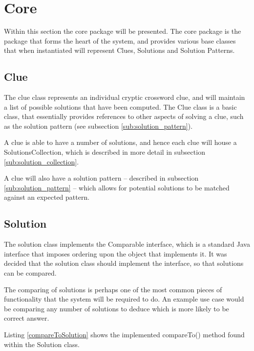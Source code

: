 \section{Core}
\label{sec:core}

Within this section the core package will be presented. The core package is the 
package that forms the heart of the system, and provides various base classes
that when instantiated will represent Clues, Solutions and Solution Patterns.


\subsection{Clue}
\label{sub:clue}

The clue class represents an individual cryptic crossword clue, and will 
maintain a list of possible solutions that have been computed. The Clue class is
a basic class, that essentially provides references to other aspects of solving 
a clue, such as the solution pattern (see subsection \ref{sub:solution_pattern}).

A clue is able to have a number of solutions, and hence each clue will house a 
SolutionsCollection, which is described in more detail in subsection 
\ref{sub:solution_collection}.

A clue will also have a solution pattern -- described in subsection 
\ref{sub:solution_pattern} -- which allows for potential solutions to be matched 
against an expected pattern.


\subsection{Solution}
\label{sub:solution}

The solution class implements the Comparable interface, which is a standard Java
interface that imposes ordering upon the object that implements it. It was 
decided that the solution class should implement the interface, so that 
solutions can be compared.

The comparing of solutions is perhaps one of the most common pieces of 
functionality that the system will be required to do. An example use case would
be comparing any number of solutions to deduce which is more likely to be 
correct answer.

Listing \ref{compareToSolution} shows the implemented compareTo() method found
within the Solution class.

